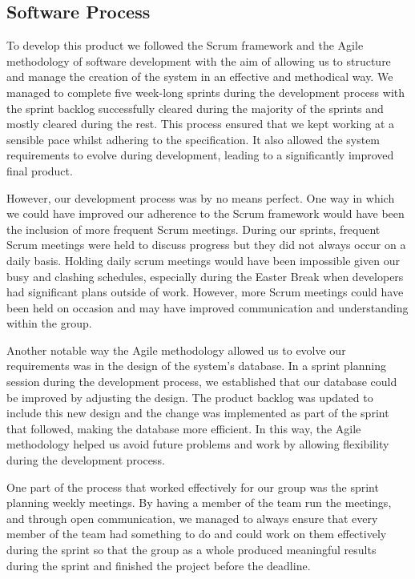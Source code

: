 \documentclass[11pt]{article}
\begin{document}
\subsection{Software Process}

To develop this product we followed the Scrum framework and the Agile 
methodology of software development with the aim of allowing us to structure 
and manage the creation of the system in an effective and methodical way. We 
managed to complete five week-long sprints during the development process with 
the sprint backlog successfully cleared during the majority of the sprints and 
mostly cleared during the rest.  This process ensured that we kept working at a sensible 
pace whilst adhering to the specification. It also 
allowed the system requirements to evolve during development, leading to a 
significantly improved final product.\par

However, our development process was by no means perfect. One way in which we 
could have improved our adherence to the Scrum framework 
would have been the inclusion of more frequent Scrum meetings. During our 
sprints, frequent Scrum meetings were held to discuss progress but they did 
not always occur on a daily basis. Holding daily scrum meetings would have 
been impossible given our busy and clashing schedules, especially during 
the Easter Break when developers had significant plans outside of work. 
However, more Scrum meetings could have been held on occasion and may have 
improved communication and understanding within the group.\par

Another notable way the Agile methodology allowed us to evolve our requirements 
was in the design of the system's database. In a sprint planning session 
during the development process, we established that our database 
could be improved by adjusting the design. The product 
backlog was updated to include this new design and the change was implemented 
as part of the sprint that followed, making the database more efficient. In 
this way, the Agile methodology helped us avoid future problems and work by 
allowing flexibility during the development process.\par

One part of the process that worked effectively for our group was 
the sprint planning weekly meetings. By having a member of the team run the 
meetings, and through open communication, we managed to always ensure that 
every member of the team had something to do and could work on them 
effectively during the sprint so that the group as a whole produced 
meaningful results during the sprint and finished the project before 
the deadline.\par
\end{document}
